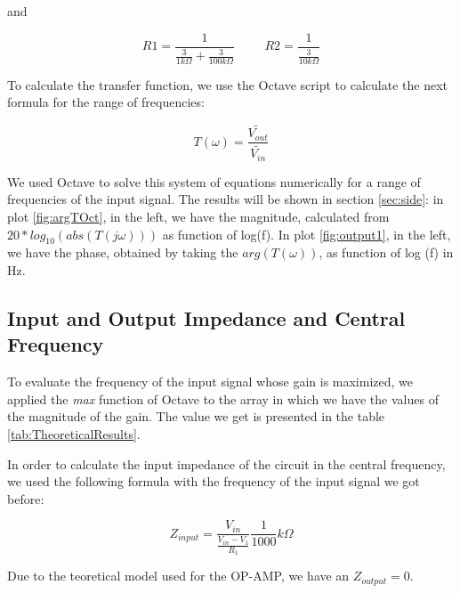and

\begin{equation}
  R1 = \frac{1}{\frac{3}{1 k \Omega} + \frac{3}{100 k \Omega}} \hspace{1cm} R2 = \frac{1}{\frac{3}{10 k\Omega}}
\end{equation}


To calculate the transfer function, we use the Octave script to calculate the next formula for the range of frequencies:

\begin{equation}
  T(\omega) = \frac{\widetilde{V_{out}}}{\widetilde{V_{in}}}
  \label{frequencyR}
\end{equation}

We used Octave to solve this system of equations numerically for a range of frequencies of the input signal. The results will be shown in section \ref{sec:side}:
in plot \ref{fig:argTOct}, in the left, we have the magnitude, calculated from $20*log_{10}(abs(T(j\omega)))$ as function of log(f).
In plot \ref{fig:output1}, in the left, we have the phase, obtained by taking the $arg(T(\omega))$, as function of log (f) in Hz.

\subsection{Input and Output Impedance and Central Frequency}

To evaluate the frequency of the input signal whose gain is maximized, we applied the \textit{max} function of Octave to the array in which
we have the values of the magnitude of the gain. The value we get is presented in the table \ref*{tab:TheoreticalResults}.

In order to calculate the input impedance of the circuit in the central frequency,
we used the following formula with the frequency of the input signal we got before:

\begin{equation}
  Z_{input} = \frac{V_{in}}{\frac{V_{in} - V_1}{R_1}} \frac{1}{1000} k \Omega
\end{equation}

Due to the teoretical model used for the OP-AMP, we have an $Z_{output} = 0$.

